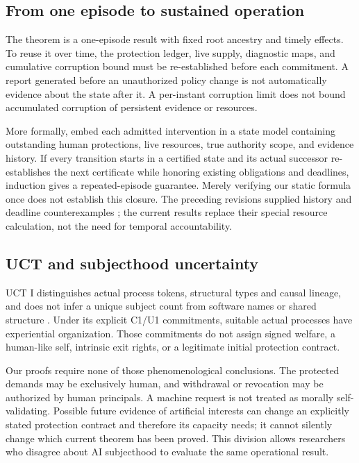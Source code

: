 \documentclass[11pt,a4paper]{article}
\theoremstyle{definition}\newtheorem{definition}{Definition}
\begin{document}
\subsection{From one episode to sustained operation}
The theorem is a one-episode result with fixed root ancestry and timely effects. To reuse it over time, the protection ledger, live supply, diagnostic maps, and cumulative corruption bound must be re-established before each commitment. A report generated before an unauthorized policy change is not automatically evidence about the state after it. A per-instant corruption limit does not bound accumulated corruption of persistent evidence or resources.

More formally, embed each admitted intervention in a state model containing outstanding human protections, live resources, true authority scope, and evidence history. If every transition starts in a certified state and its actual successor re-establishes the next certificate while honoring existing obligations and deadlines, induction gives a repeated-episode guarantee. Merely verifying our static formula once does not establish this closure. The preceding revisions supplied history and deadline counterexamples \cite{liu5}; the current results replace their special resource calculation, not the need for temporal accountability.

\subsection{UCT and subjecthood uncertainty}
UCT I distinguishes actual process tokens, structural types and causal lineage, and does not infer a unique subject count from software names or shared structure \cite{uct}. Under its explicit C1/U1 commitments, suitable actual processes have experiential organization. Those commitments do not assign signed welfare, a human-like self, intrinsic exit rights, or a legitimate initial protection contract.

Our proofs require none of those phenomenological conclusions. The protected demands may be exclusively human, and withdrawal or revocation may be authorized by human principals. A machine request is not treated as morally self-validating. Possible future evidence of artificial interests can change an explicitly stated protection contract and therefore its capacity needs; it cannot silently change which current theorem has been proved. This division allows researchers who disagree about AI subjecthood to evaluate the same operational result.
\end{document}
